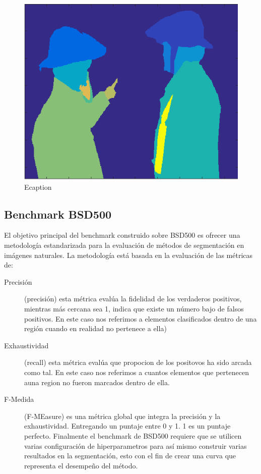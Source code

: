 \documentclass[10pt,twocolumn,letterpaper]{article}
\begin{document}
\begin{figure}

\includegraphics[width=0.85\linewidth]
                   {img/Imagesc.png}
   \caption{Ecaption}
\label{fig:short2}
\end{figure}

\subsection{Benchmark  BSD500}
El objetivo principal del benchmark construido sobre BSD500 es ofrecer una metodología estandarizada para la evaluación de métodos de segmentación en imágenes naturales. La metodología está basada en la evaluación de las métricas de:
\begin{description}


\item[Precisión] (precisión) esta métrica evalúa la fidelidad de los verdaderos positivos, mientras más cercana sea 1, indica que existe un número bajo de falsos positivos. En este caso nos referimos a elementos clasificados dentro de una región cuando en realidad no pertenece a ella) 

\item[Exhaustividad] (recall) esta métrica evalúa que propocion  de los positovos ha sido arcada como tal. En este caso nos referimos a cuantos elementos que pertenecen auna region no fueron marcados dentro de ella.

\item[F-Medida] (F-MEasure)  es una métrica global que integra la precisión y la exhaustividad. Entregando un puntaje entre 0 y 1. 1 es un puntaje perfecto.
Finalmente el benchmark de BSD500 requiere que se utilicen varias configuración de hiperparametros para así mismo construir varias resultados en la segmentación,  esto con el fin de crear una curva que representa el desempeño del método.
\end{description}
\end{document}
